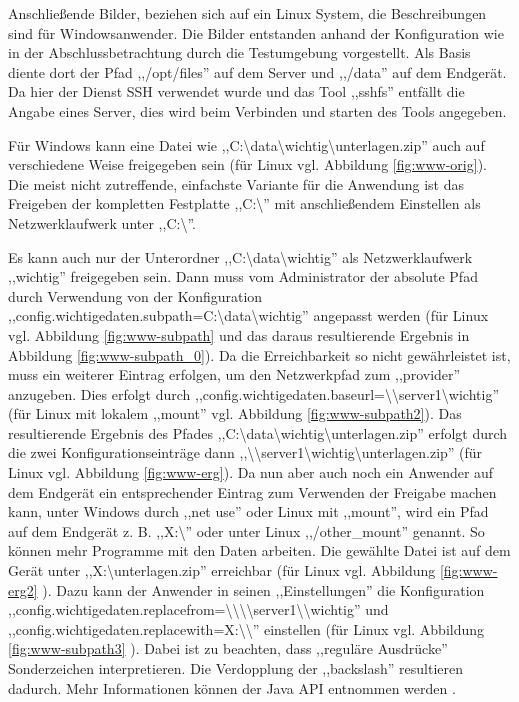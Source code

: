 \documentclass[oneside, ngerman, toc=bibliography,bibliography=totoc,listof=entryprefix, open=right,numbers=noenddot,fontsize=12pt]{scrbook}
\begin{document}
Anschließende Bilder, beziehen sich auf ein Linux System, die Beschreibungen sind für Windowsanwender.
Die Bilder entstanden anhand der Konfiguration wie in der Abschlussbetrachtung durch die Testumgebung vorgestellt. Als Basis diente dort der Pfad ,,/opt/files'' auf dem Server und ,,/data'' auf dem Endgerät.
Da hier der Dienst SSH verwendet wurde und das Tool ,,sshfs'' entfällt die Angabe eines Server, dies wird beim Verbinden und starten des Tools angegeben.


Für Windows kann eine Datei wie ,,C:\textbackslash{}data\textbackslash{}wichtig\textbackslash{}unterlagen.zip'' auch auf verschiedene Weise freigegeben sein (für Linux vgl. Abbildung \ref{fig:www-orig}).
Die meist nicht zutreffende, einfachste Variante für die Anwendung ist das Freigeben der kompletten Festplatte ,,C:\textbackslash{}'' mit anschließendem Einstellen als Netzwerklaufwerk unter ,,C:\textbackslash{}''.


Es kann auch nur der Unterordner ,,C:\textbackslash{}data\textbackslash{}wichtig'' als Netzwerklaufwerk ,,wichtig'' freigegeben sein. Dann muss vom Administrator der absolute Pfad durch Verwendung von der Konfiguration ,,config.wichtigedaten.subpath=C:\textbackslash{}data\textbackslash{}wichtig'' angepasst werden (für Linux vgl. Abbildung \ref{fig:www-subpath} und das daraus resultierende Ergebnis in Abbildung \ref{fig:www-subpath_0}). Da die Erreichbarkeit so nicht gewährleistet ist, muss ein weiterer Eintrag erfolgen, um den Netzwerkpfad zum ,,provider'' anzugeben. Dies erfolgt durch ,,config.wichtigedaten.baseurl=\textbackslash{}\textbackslash{}server1\textbackslash{}wichtig'' (für Linux mit lokalem ,,mount'' vgl. Abbildung  \ref{fig:www-subpath2}). Das resultierende Ergebnis des Pfades ,,C:\textbackslash{}data\textbackslash{}wichtig\textbackslash{}unterlagen.zip'' erfolgt durch die zwei Konfigurationseinträge dann ,,\textbackslash{}\textbackslash{}server1\textbackslash{}wichtig\textbackslash{}unterlagen.zip'' (für Linux vgl. Abbildung \ref{fig:www-erg}). Da nun aber auch noch ein Anwender auf dem Endgerät ein entsprechender Eintrag zum Verwenden der Freigabe machen kann, unter Windows durch ,,net use'' oder Linux mit ,,mount'', wird ein Pfad auf dem Endgerät z. B. ,,X:\textbackslash{}'' oder unter Linux ,,/other\_mount''  genannt. So können mehr Programme mit den Daten arbeiten. Die gewählte Datei ist auf dem Gerät unter ,,X:\textbackslash{}unterlagen.zip'' erreichbar (für Linux vgl. Abbildung \ref{fig:www-erg2} ).
Dazu kann der Anwender in seinen ,,Einstellungen'' die Konfiguration ,,config.wichtigedaten.replacefrom=\textbackslash{}\textbackslash{}\textbackslash{}\textbackslash{}server1\textbackslash{}\textbackslash{}wichtig'' und ,,config.wichtigedaten.replacewith=X:\textbackslash{}\textbackslash{}'' einstellen  (für Linux vgl. Abbildung \ref{fig:www-subpath3} ). Dabei ist zu beachten, dass ,,reguläre Ausdrücke'' Sonderzeichen interpretieren. 
Die Verdopplung der ,,backslash'' resultieren dadurch. Mehr Informationen können der Java API entnommen werden  \cite{javaregex}.
\end{document}
